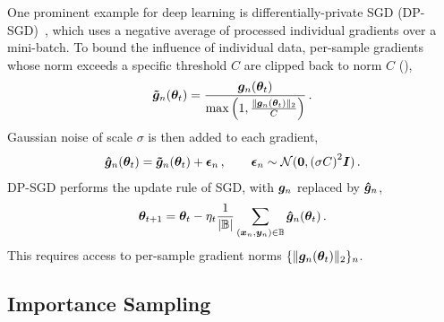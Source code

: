 One prominent example for deep learning is differentially-private SGD
(DP-SGD)~\cite[Algorithm 1]{abadi2016deep}, which uses a negative average of
processed individual gradients over a mini-batch. To bound the influence of
individual data, per-sample gradients whose norm exceeds a specific threshold
$C$ are clipped back to norm $C$ (),
\begin{align*}
  \bm{\tilde{g}}_n({\bm{\theta}}_t)
  =
  \frac{
  {\bm{g}}_n({\bm{\theta}}_t)
  }{
  \max\left(
  1,
  \frac{\lVert {\bm{g}}_n({\bm{\theta}}_t) \rVert_2}{C}
  \right)
  }\,.
\end{align*}
Gaussian noise of scale $\sigma$ is then added to each gradient,
\begin{align*}
  \bm{\hat{g}}_n({\bm{\theta}}_t)
  =
  \bm{\tilde{g}}_n({\bm{\theta}}_t) + {\bm{\epsilon}}_n\,,
  \qquad
  {\bm{\epsilon}}_n \sim {\mathcal{N}}({\bm{0}}, {(\sigma C)}^2 {\bm{I}})\,.
\end{align*}
DP-SGD performs the update rule of SGD, with ${\bm{g}}_n$ replaced by
$\bm{\hat{g}}_n$,
\begin{align*}
  {\bm{\theta}}_{t+1}
  =
  {\bm{\theta}}_t
  -
  \eta_t
  \frac{1}{|{\mathbb{B}}|}
  \sum_{({\bm{x}}_n,{\bm{y}}_n) \in {\mathbb{B}}}
  \bm{\hat{g}}_n({\bm{\theta}}_t)\,.
\end{align*}
This requires access to per-sample gradient norms $\{\lVert {\bm{g}}_n({\bm{\theta}}_t)
\rVert_2\}_{n}$.

\subsection{Importance Sampling}

